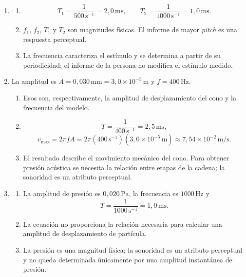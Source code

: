 \begin{enumerate}[label=\textbf{F\arabic*.},leftmargin=*]
    \item
    \begin{enumerate}[label=\alph*)]
        \item
        \[
            T_1=\frac{1}{500\,\text{s}^{-1}}
               =2{,}0\,\text{ms},
            \qquad
            T_2=\frac{1}{1000\,\text{s}^{-1}}
               =1{,}0\,\text{ms}.
        \]
        \item \(f_1\), \(f_2\), \(T_1\) y \(T_2\) son magnitudes físicas. El
        informe de mayor \emph{pitch} es una respuesta perceptual.
        \item La frecuencia caracteriza el estímulo y se determina a partir
        de su periodicidad; el informe de la persona no modifica el estímulo
        medido.
    \end{enumerate}

    \item La amplitud es
    \(A=0{,}030\,\text{mm}=3{,}0\times10^{-5}\,\text{m}\) y
    \(f=400\,\text{Hz}\).
    \begin{enumerate}[label=\alph*)]
        \item Esos son, respectivamente, la amplitud de desplazamiento del
        cono y la frecuencia del modelo.
        \item
        \[
            T=\frac{1}{400\,\text{s}^{-1}}
              =2{,}5\,\text{ms},
        \]
        \[
            v_{\max}=2\pi fA
              =2\pi(400\,\text{s}^{-1})
               (3{,}0\times10^{-5}\,\text{m})
              \approx7{,}54\times10^{-2}\,\text{m}/\text{s}.
        \]
        \item El resultado describe el movimiento mecánico del cono. Para
        obtener presión acústica se necesita la relación entre etapas de la
        cadena; la sonoridad es un atributo perceptual.
    \end{enumerate}

    \item
    \begin{enumerate}[label=\alph*)]
        \item La amplitud de presión es \(0{,}020\,\text{Pa}\), la frecuencia
        es \(1000\,\text{Hz}\) y
        \[
            T=\frac{1}{1000\,\text{s}^{-1}}
              =1{,}0\,\text{ms}.
        \]
        \item La ecuación no proporciona la relación necesaria para calcular
        una amplitud de desplazamiento de partícula.
        \item La presión es una magnitud física; la sonoridad es un atributo
        perceptual y no queda determinada únicamente por una amplitud
        instantánea de presión.
    \end{enumerate}
\end{enumerate}

